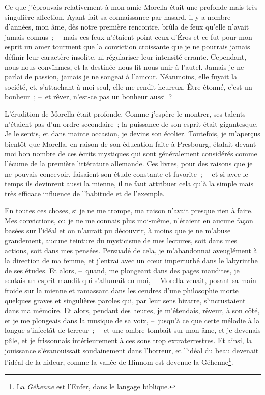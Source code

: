 \documentclass[french,twoside]{book} %
\newcommand{\bibl}[1]{{\RaggedLeft{#1}\par\bigskip}}
\begin{document}
\bibl{{\scshape Platon}.}
\noindent Ce que j’éprouvais relativement à mon amie Morella était une profonde mais très singulière affection. Ayant fait sa connaissance par hasard, il y a nombre d’années, mon âme, dès notre première rencontre, brûla de feux qu’elle n’avait jamais connus ; – mais ces feux n’étaient point ceux d’Éros et ce fut pour mon esprit un amer tourment que la conviction croissante que je ne pourrais jamais définir leur caractère insolite, ni régulariser leur intensité errante. Cependant, nous nous convînmes, et la destinée nous fit nous unir à l’autel. Jamais je ne parlai de passion, jamais je ne songeai à l’amour. Néanmoins, elle fuyait la société, et, s’attachant à moi seul, elle me rendit heureux. Être étonné, c’est un bonheur ; – et rêver, n’est-ce pas un bonheur aussi ?\par
L’érudition de Morella était profonde. Comme j’espère le montrer, ses talents n’étaient pas d’un ordre secondaire ; la puissance de son esprit était gigantesque. Je le sentis, et dans mainte occasion, je devins son écolier. Toutefois, je m’aperçus bientôt que Morella, en raison de son éducation faite à Presbourg, étalait devant moi bon nombre de ces écrits mystiques qui sont généralement considérés comme l’écume de la première littérature allemande. Ces livres, pour des raisons que je ne pouvais concevoir, faisaient son étude constante et favorite ; – et si avec le temps ils devinrent aussi la mienne, il ne faut attribuer cela qu’à la simple mais très efficace influence de l’habitude et de l’exemple.\par
En toutes ces choses, si je ne me trompe, ma raison n’avait presque rien à faire. Mes convictions, ou je ne me connais plus moi-même, n’étaient en aucune façon basées sur l’idéal et on n’aurait pu découvrir, à moins que je ne m’abuse grandement, aucune teinture du mysticisme de mes lectures, soit dans mes actions, soit dans mes pensées. Persuadé de cela, je m’abandonnai aveuglément à la direction de ma femme, et j’entrai avec un cœur imperturbé dans le labyrinthe de ses études. Et alors, – quand, me plongeant dans des pages maudites, je sentais un esprit maudit qui s’allumait en moi, – Morella venait, posant sa main froide sur la mienne et ramassant dans les cendres d’une philosophie morte quelques graves et singulières paroles qui, par leur sens bizarre, s’incrustaient dans ma mémoire. Et alors, pendant des heures, je m’étendais, rêveur, à son côté, et je me plongeais dans la musique de sa voix, – jusqu’à ce que cette mélodie à la longue s’infectât de terreur ; – et une ombre tombait sur mon âme, et je devenais pâle, et je frissonnais intérieurement à ces sons trop extraterrestres. Et ainsi, la jouissance s’évanouissait soudainement dans l’horreur, et l’idéal du beau devenait l’idéal de la hideur, comme la vallée de Hinnom est devenue la Géhenne\footnote{La \emph{Géhenne} est l’Enfer, dans le langage biblique.}.\par
\end{document}
